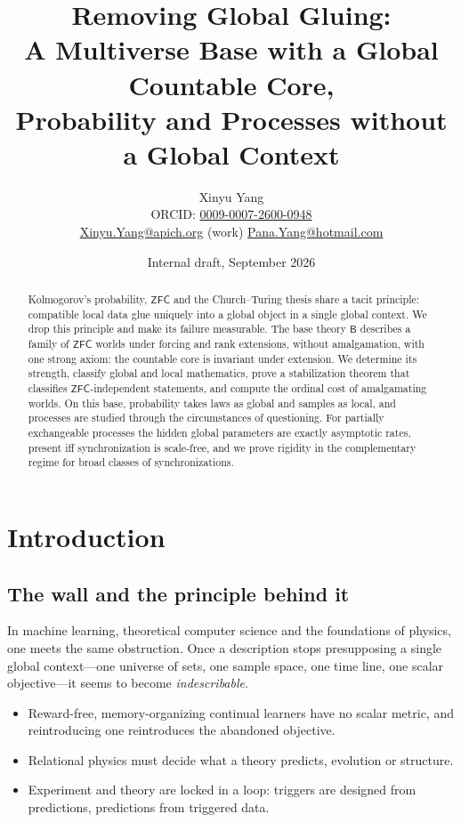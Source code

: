 \documentclass[11pt]{article}
\title{Removing Global Gluing:\\
A Multiverse Base with a Global Countable Core,\\
Probability and Processes without a Global Context}
\author{Xinyu Yang\\[2pt]
\small ORCID: \href{https://orcid.org/0009-0007-2600-0948}{0009-0007-2600-0948}\\
\small \href{mailto:Xinyu.Yang@apich.org}{Xinyu.Yang@apich.org} (work) \quad
\href{mailto:Pana.Yang@hotmail.com}{Pana.Yang@hotmail.com}}
\date{Internal draft, September 2026}
\theoremstyle{definition}
\theoremstyle{remark}
\newcommand{\B}{\mathsf{B}}
\newcommand{\ZFC}{\mathsf{ZFC}}
\begin{document}
\sloppy
\maketitle

\begin{abstract}
Kolmogorov's probability, $\ZFC$ and the Church--Turing thesis share a tacit principle: compatible local data glue uniquely into a global object in a single global context. We drop this principle and make its failure measurable. The base theory $\B$ describes a family of $\ZFC$ worlds under forcing and rank extensions, without amalgamation, with one strong axiom: the countable core is invariant under extension. We determine its strength, classify global and local mathematics, prove a stabilization theorem that classifies $\ZFC$-independent statements, and compute the ordinal cost of amalgamating worlds. On this base, probability takes laws as global and samples as local, and processes are studied through the circumstances of questioning. For partially exchangeable processes the hidden global parameters are exactly asymptotic rates, present iff synchronization is scale-free, and we prove rigidity in the complementary regime for broad classes of synchronizations.
\end{abstract}

\tableofcontents

\section{Introduction}\label{sec:intro}

\subsection{The wall and the principle behind it}

In machine learning, theoretical computer science and the foundations of physics, one meets the same obstruction. Once a description stops presupposing a single global context---one universe of sets, one sample space, one time line, one scalar objective---it seems to become \emph{indescribable}.
\begin{itemize}
\item Reward-free, memory-organizing continual learners have no scalar metric, and reintroducing one reintroduces the abandoned objective.
\item Relational physics must decide what a theory predicts, evolution or structure.
\item Experiment and theory are locked in a loop: triggers are designed from predictions, predictions from triggered data.
\end{itemize}
\end{document}
